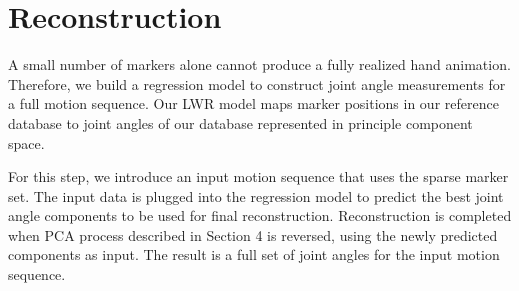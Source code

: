 
\section{Reconstruction}

A small number of markers alone cannot produce a fully
realized hand animation. Therefore, we build a regression model 
to construct joint angle measurements for a full motion sequence.
Our LWR model maps marker positions in our reference database
to joint angles of our database represented in principle
component space.

For this step, we introduce an input motion sequence
that uses the sparse marker set. The input data is 
plugged into the regression model to predict the best
joint angle components to be used for final reconstruction.
Reconstruction is completed when PCA process described in 
Section 4 is reversed, using the newly predicted components
as input. The result is a full set of joint angles for the
input motion sequence.





